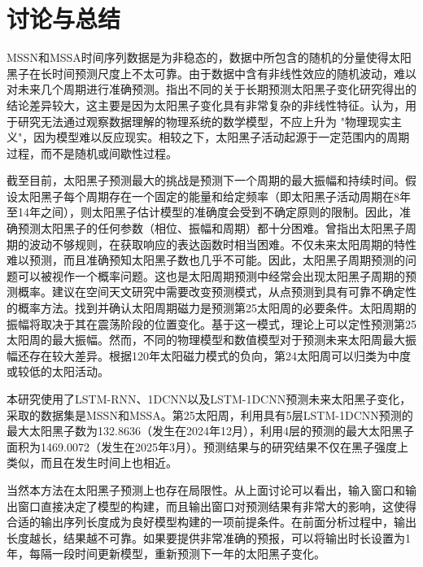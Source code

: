 \section{讨论与总结}\label{sec:ss_conclusion}

MSSN和MSSA时间序列数据是为非稳态的，数据中所包含的随机的分量使得太阳黑子在长时间预测尺度上不太可靠。由于数据中含有非线性效应的随机波动，难以对未来几个周期进行准确预测\citep{charbonneau2010dynamo,petrovay2010solar}。\citet{solanki2011analyzing}指出不同的关于长期预测太阳黑子变化研究得出的结论差异较大，这主要是因为太阳黑子变化具有非常复杂的非线性特征。\citet{charbonneau2010dynamo}认为，用于研究无法通过观察数据理解的物理系统的数学模型，不应上升为 "物理现实主义"，因为模型难以反应现实。相较之下，太阳黑子活动起源于一定范围内的周期过程，而不是随机或间歇性过程\citep{mendoza2011mid}。

截至目前，太阳黑子预测最大的挑战是预测下一个周期的最大振幅和持续时间\citep{petrovay2010solar}。\citet{herrera2015reconstruction}假设太阳黑子每个周期存在一个固定的能量和给定频率（即太阳黑子活动周期在8年至14年之间），则太阳黑子估计模型的准确度会受到不确定原则的限制。因此，准确预测太阳黑子的任何参数（相位、振幅和周期）都十分困难。\citet{gleissberg1939long}曾指出太阳黑子周期的波动不够规则，在获取响应的表达函数时相当困难。不仅未来太阳周期的特性难以预测，而且准确预知太阳黑子数也几乎不可能。因此，太阳黑子周期预测的问题可以被视作一个概率问题。这也是太阳周期预测中经常会出现太阳黑子周期的预测概率。\citet{camporeale2019challenge}建议在空间天文研究中需要改变预测模式，从点预测到具有可靠不确定性的概率方法。找到并确认太阳周期磁力是预测第25太阳周的必要条件。太阳周期的振幅将取决于其在震荡阶段的位置变化。基于这一模式，理论上可以定性预测第25太阳周的最大振幅。然而，不同的物理模型和数值模型对于预测未来太阳周最大振幅还存在较大差异。根据120年太阳磁力模式的负向，第24太阳周可以归类为中度或较低的太阳活动。

本研究使用了LSTM-RNN、1DCNN以及LSTM-1DCNN预测未来太阳黑子变化，采取的数据集是MSSN和MSSA。第25太阳周，利用具有5层LSTM-1DCNN预测的最大太阳黑子数为132.8636（发生在2024年12月），利用4层的预测的最大太阳黑子面积为1469.0072（发生在2025年3月）。预测结果与\citet{covas2019neural}的研究结果不仅在黑子强度上类似，而且在发生时间上也相近。

当然本方法在太阳黑子预测上也存在局限性。从上面讨论可以看出，输入窗口和输出窗口直接决定了模型的构建，而且输出窗口对预测结果有非常大的影响，这使得合适的输出序列长度成为良好模型构建的一项前提条件。在前面分析过程中，输出长度越长，结果越不可靠。如果要提供非常准确的预报，可以将输出时长设置为1年，每隔一段时间更新模型，重新预测下一年的太阳黑子变化。
